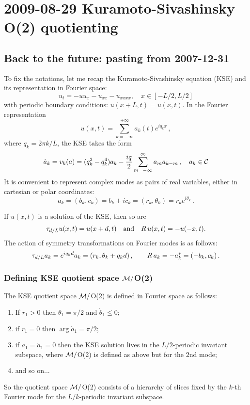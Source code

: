 \section{2009-08-29 Kuramoto-Sivashinsky O(2) quotienting}

\subsection{Back to the future: pasting from 2007-12-31}

\medskip{}
To fix the notations, let me recap the Kuramoto-Sivashinsky
equation (KSE) and its representation in Fourier space:
\[ u_t = -uu_x - u_{xx} - u_{xxxx},  \quad x \in [-L/2, L/2] \]
with periodic boundary conditions:  $u(x+L,t) = u(x,t)$.  In the Fourier representation
\[ u(x,t)=\sum_{k=-\infty}^{+\infty} a_k (t) e^{ i q_k x }\,,\]
where $ q_k = 2\pi k/L$, the KSE takes the form
\[ \dot{a}_k = v_k(a) = (q_k^2 - q_k^4)a_k - \frac{iq}{2}\sum_{m=-\infty}^{\infty}
    a_m a_{k-m}\,,\quad a_k \in {\cal C}\]
It is convenient to represent complex modes as pairs of real
variables, either in cartesian or polar coordinates:
\[ a_k = (b_k, c_k) = b_k + ic_k = (r_k, \theta_k) = r_k e^{i\theta_k}\,. \]

 If $u(x,t)$ is a solution of the KSE, then so are
\[ \tau_{d/L} u(x,t) = u(x+d,t) \quad\mbox{and}\quad R\,u(x,t) = -u(-x,t).\]
The action of symmetry transformations on Fourier modes is as follows:
\[ \tau_{d/L} a_k = e^{iq_k d} a_k = (r_k, \theta_k + q_k d) \,,\qquad R\,a_k = -a_k^\ast = (-b_k, c_k)\,.\]

\subsubsection{Defining KSE quotient space ${\cal M}/$O(2)} %
\label{sect:RLDslice}

The KSE quotient space ${\cal M}/$O(2) is defined in Fourier space as follows:
\begin{enumerate}
\item If $r_1 > 0$ then $\theta_1 = \pi/2$ and $\dot{\theta}_1 \leq 0$;
\item if $r_1 = 0$ then $\arg \dot{a}_1 = \pi/2$;
\item if $a_1 = \dot{a}_1 = 0$ then the KSE solution lives in
        the $L/2$-periodic invariant subspace, where ${\cal M}/$O(2) is
        defined as above but for the 2nd mode;
\item and so on...
\end{enumerate}
So the quotient space ${\cal M}/$O(2) consists of a hierarchy of
slices fixed by the $k$-th Fourier mode for the
$L/k$-periodic invariant subspace.

